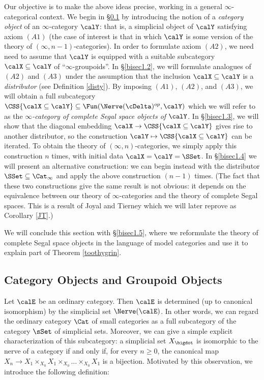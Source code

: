 Our objective is to make the above ideas precise, working in a general
$\infty$-categorical context. We begin in \S \ref{bisec1.1} by introducing the
notion of a {\it category object} of an $\infty$-category $\calY$: that is, a
simplicial object of $\calY$ satisfying axiom $(A1)$ (the case
of interest is that in which $\calY$ is some version of the theory
of $(\infty,n-1)$-categories). In order to formulate axiom $(A2)$, we need
need to assume that $\calY$ is equipped with a suitable subcategory
$\calX \subseteq \calY$ of ``$\infty$-groupoids''. In \S \ref{bisec1.2}, we will
formulate analogues of $(A2)$ and $(A3)$ under the assumption
that the inclusion $\calX \subseteq \calY$ is a {\it distributor} (see Definition \ref{disty}).
By imposing $(A1)$, $(A2)$, and $(A3)$, we will obtain a full subcategory
$\CSS{\calX \subseteq \calY} \subseteq \Fun( \Nerve(\cDelta)^{op}, \calY)$ which
we will refer to as the {\it $\infty$-category of complete Segal space objects of $\calY$}.
In \S \ref{bisec1.3}, we will show that the diagonal embedding
$\calX \rightarrow \CSS{\calX \subseteq \calY}$ gives rise to another distributor,
so the construction $\calY \mapsto \CSS{\calX \subseteq \calY}$ can be iterated.
To obtain the theory of $(\infty,n)$-categories, we simply apply this construction
$n$ times, with initial data $\calX = \calY = \SSet$. In \S \ref{bisec1.4} we will
present an alternative construction: we can begin instead with the
distributor $\SSet \subseteq \Cat_{\infty}$ and apply the above construction $(n-1)$ times.
(The fact that these two constructions give the same result is not obvious: it depends on the 
equivalence between our theory of $\infty$-categories and the theory of complete
Segal spaces. This is a result of Joyal and Tierney which we will later reprove as
Corollary \ref{JT}.)

We will conclude this section with \S \ref{bisec1.5}, where we reformulate the theory
of complete Segal space objects in the language of model categories and use it to explain part
of Theorem \ref{toothygrin}.

\subsection{Category Objects and Groupoid Objects}\label{bisec1.1}

Let $\calE$ be an ordinary category. Then $\calE$ is determined (up to canonical isomorphism)
by the simplicial set $\Nerve(\calE)$. In other words, we can regard the ordinary category
$\Cat$ of small categories as a full subcategory of the category $\sSet$ of simplicial sets.
Moreover, we can give a simple explicit characterization of this subcategory:
a simplicial set $X_{\bigdot}$ is isomorphic to the nerve of a category if and only if,
for every $n \geq 0$, the canonical map
$X_{n} \rightarrow X_1 \times_{X_0} X_1 \times_{X_0} \ldots \times_{X_0} X_1$
is a bijection. Motivated by this observation, we introduce the following definition:

